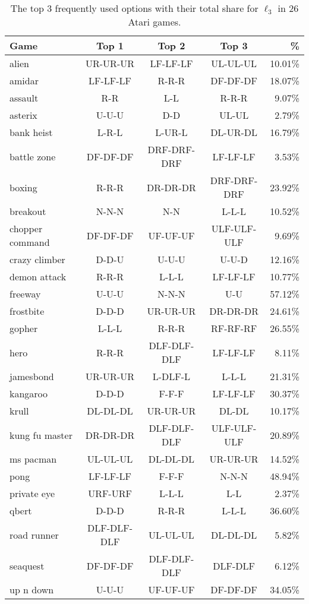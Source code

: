 \begin{table}[h!]
    \caption{The top 3 frequently used options with their total share for $\ell_3$ in 26 Atari games.}
    \centering
    \small
    \begin{tabular}{l|ccc|r}
        \toprule
        Game & Top 1 & Top 2 & Top 3 & \% \\
        \midrule
        alien & UR-UR-UR & LF-LF-LF & UL-UL-UL & 10.01\% \\
        amidar & LF-LF-LF & R-R-R & DF-DF-DF & 18.07\% \\
        assault & R-R & L-L & R-R-R & 9.07\% \\
        asterix & U-U-U & D-D & UL-UL & 2.79\% \\
        bank heist & L-R-L & L-UR-L & DL-UR-DL & 16.79\% \\
        battle zone & DF-DF-DF & DRF-DRF-DRF & LF-LF-LF & 3.53\% \\
        boxing & R-R-R & DR-DR-DR & DRF-DRF-DRF & 23.92\% \\
        breakout & N-N-N & N-N & L-L-L & 10.52\% \\
        chopper command & DF-DF-DF & UF-UF-UF & ULF-ULF-ULF & 9.69\% \\
        crazy climber & D-D-U & U-U-U & U-U-D & 12.16\% \\
        demon attack & R-R-R & L-L-L & LF-LF-LF & 10.77\% \\
        freeway & U-U-U & N-N-N & U-U & 57.12\% \\
        frostbite & D-D-D & UR-UR-UR & DR-DR-DR & 24.61\% \\
        gopher & L-L-L & R-R-R & RF-RF-RF & 26.55\% \\
        hero & R-R-R & DLF-DLF-DLF & LF-LF-LF & 8.11\% \\
        jamesbond & UR-UR-UR & L-DLF-L & L-L-L & 21.31\% \\
        kangaroo & D-D-D & F-F-F & LF-LF-LF & 30.37\% \\
        krull & DL-DL-DL & UR-UR-UR & DL-DL & 10.17\% \\
        kung fu master & DR-DR-DR & DLF-DLF-DLF & ULF-ULF-ULF & 20.89\% \\
        ms pacman & UL-UL-UL & DL-DL-DL & UR-UR-UR & 14.52\% \\
        pong & LF-LF-LF & F-F-F & N-N-N & 48.94\% \\
        private eye & URF-URF & L-L-L & L-L & 2.37\% \\
        qbert & D-D-D & R-R-R & L-L-L & 36.60\% \\
        road runner & DLF-DLF-DLF & UL-UL-UL & DL-DL-DL & 5.82\% \\
        seaquest & DF-DF-DF & DLF-DLF-DLF & DLF-DLF & 6.12\% \\
        up n down & U-U-U & UF-UF-UF & DF-DF-DF & 34.05\% \\
        \bottomrule
    \end{tabular}
    \label{tab:option-top3-op3}
\end{table}

